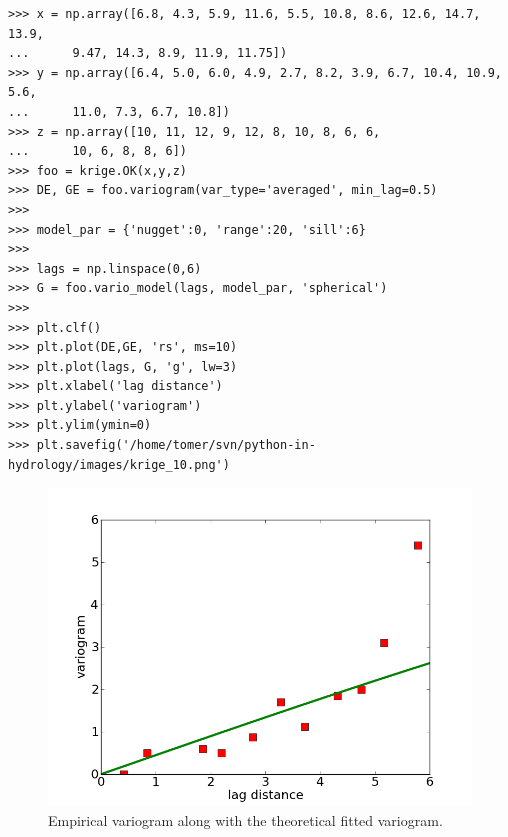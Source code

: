 \documentclass[10pt]{book}
\begin{document}
\beforeverb \begin{verbatim}
>>> x = np.array([6.8, 4.3, 5.9, 11.6, 5.5, 10.8, 8.6, 12.6, 14.7, 13.9, 
...      9.47, 14.3, 8.9, 11.9, 11.75])
>>> y = np.array([6.4, 5.0, 6.0, 4.9, 2.7, 8.2, 3.9, 6.7, 10.4, 10.9, 5.6, 
...      11.0, 7.3, 6.7, 10.8])
>>> z = np.array([10, 11, 12, 9, 12, 8, 10, 8, 6, 6, 
...      10, 6, 8, 8, 6])
>>> foo = krige.OK(x,y,z)
>>> DE, GE = foo.variogram(var_type='averaged', min_lag=0.5)
>>> 
>>> model_par = {'nugget':0, 'range':20, 'sill':6}
>>> 
>>> lags = np.linspace(0,6)
>>> G = foo.vario_model(lags, model_par, 'spherical')
>>> 
>>> plt.clf()
>>> plt.plot(DE,GE, 'rs', ms=10)
>>> plt.plot(lags, G, 'g', lw=3)
>>> plt.xlabel('lag distance')
>>> plt.ylabel('variogram')
>>> plt.ylim(ymin=0)
>>> plt.savefig('/home/tomer/svn/python-in-hydrology/images/krige_10.png')
\end{verbatim} \afterverb

\beforefig
\begin{figure}[h!]
  \centering
    \includegraphics[scale=0.5]{images/krige_10.png}
  \caption{Empirical variogram along with the theoretical fitted variogram.}
   \label{fig:krige_10}
\end{figure}
\afterfig
\end{document}
